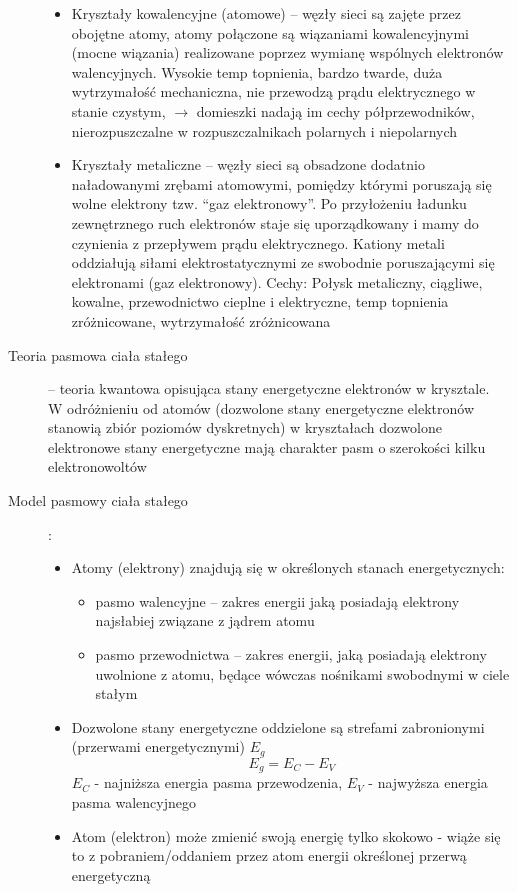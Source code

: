 \documentclass[a4paper,11pt]{article}
\begin{document}
\begin{description}
\begin{itemize}
  \item Kryształy kowalencyjne (atomowe) -- węzły sieci są zajęte przez obojętne atomy, atomy połączone są wiązaniami kowalencyjnymi (mocne wiązania) realizowane poprzez wymianę wspólnych elektronów walencyjnych. Wysokie temp topnienia, bardzo twarde, duża wytrzymałość mechaniczna, nie przewodzą prądu elektrycznego w stanie czystym, $\longrightarrow$ domieszki nadają im cechy półprzewodników, nierozpuszczalne w rozpuszczalnikach polarnych i niepolarnych
  \item Kryształy metaliczne -- węzły sieci są obsadzone dodatnio naładowanymi zrębami atomowymi, pomiędzy którymi poruszają się wolne elektrony tzw. ``gaz elektronowy''. Po przyłożeniu ładunku zewnętrznego ruch elektronów staje się uporządkowany i mamy do czynienia z przepływem prądu elektrycznego. Kationy metali oddziałują siłami elektrostatycznymi ze swobodnie poruszającymi się elektronami (gaz elektronowy). Cechy: Połysk metaliczny, ciągliwe, kowalne, przewodnictwo cieplne i elektryczne, temp topnienia zróżnicowane, wytrzymałość zróżnicowana
  \end{itemize}
\item[Teoria pasmowa ciała stałego] -- teoria kwantowa opisująca stany energetyczne elektronów w krysztale. \\
  W odróżnieniu od atomów (dozwolone stany energetyczne elektronów stanowią zbiór poziomów dyskretnych) w kryształach dozwolone elektronowe stany energetyczne mają charakter pasm o szerokości kilku elektronowoltów
\item[Model pasmowy ciała stałego]:
  \begin{itemize}
  \item Atomy (elektrony) znajdują się w określonych stanach energetycznych:
    \begin{itemize}
    \item pasmo walencyjne -- zakres energii jaką posiadają elektrony najsłabiej związane z jądrem atomu
    \item pasmo przewodnictwa -- zakres energii, jaką posiadają elektrony uwolnione z atomu, będące wówczas nośnikami swobodnymi w ciele stałym
    \end{itemize}
  \item Dozwolone stany energetyczne oddzielone są strefami zabronionymi (przerwami energetycznymi) $E_g$
    $$E_g = E_C-E_V$$
    $E_C$ - najniższa energia pasma przewodzenia, $E_V$ - najwyższa energia pasma walencyjnego
  \item Atom (elektron) może zmienić swoją energię tylko skokowo - wiąże się to z pobraniem/oddaniem przez atom energii określonej przerwą energetyczną

\end{itemize}
\end{description}
\end{document}

